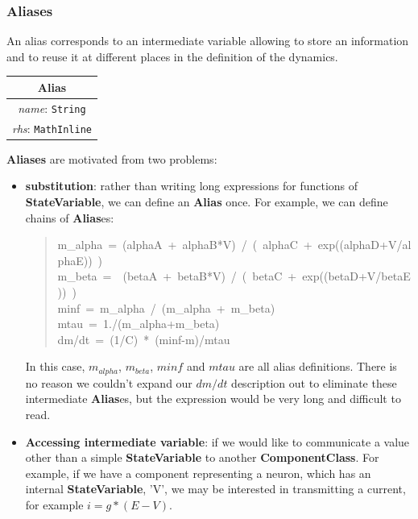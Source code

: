 \documentclass{article}
\newcommand{\ComponentClass}{{\bf{ComponentClass}}\xspace}
\newcommand{\StateVariable}{{\bf{StateVariable}}\xspace}
\newcommand{\Alias}{{\bf{Alias}}\xspace}
\newcommand{\Aliases}{{\bf{Alias}}es\xspace}
\begin{document}
\subsubsection{Aliases}
\label{alias}

An alias corresponds to an intermediate variable allowing to store an
information and to reuse it at different places in the definition of
the dynamics.

\begin{table}[htb]
\center
\begin{tabular}{|c|}
\hline
\hline
Alias \\
\hline
\hline
{\em name}: {\tt String} \\
\hline
{\em rhs}: {\tt MathInline} \\
\hline
\end{tabular}
\end{table}

\textbf{Aliases} are motivated from two problems:

\begin{itemize}
\item {\bf substitution}: rather than writing long expressions for functions of
\StateVariable, we can define an \Alias once. For example, we can define chains
of \Aliases:
%
\begin{quote}{\ttfamily \raggedright \noindent
m\_alpha~=~(alphaA~+~alphaB*V)~/~(~alphaC~+~exp((alphaD+V/alphaE))~)\\
m\_beta~=~~(betaA~+~betaB*V)~/~(~betaC~+~exp((betaD+V/betaE))~)\\
minf~=~m\_alpha~/~(m\_alpha~+~m\_beta)\\
mtau~=~1./(m\_alpha+m\_beta)\\
dm/dt~=~(1/C)~*~(minf-m)/mtau
}
\end{quote}

In this case, $m_{alpha}$, $m_{beta}$, $minf$ and $mtau$ are all
alias definitions. There is no reason we couldn't expand our $dm/dt$
description out to eliminate these intermediate \Aliases, but the expression
would be very long and difficult to read.

\item {\bf Accessing intermediate variable}: if we would like to communicate a
value other than a simple \StateVariable to another \ComponentClass. For
example, if we have a component representing a
neuron, which has an internal \StateVariable, 'V', we may be interested in
transmitting a current, for example $i=g*(E-V)$.

\end{itemize}
\end{document}
